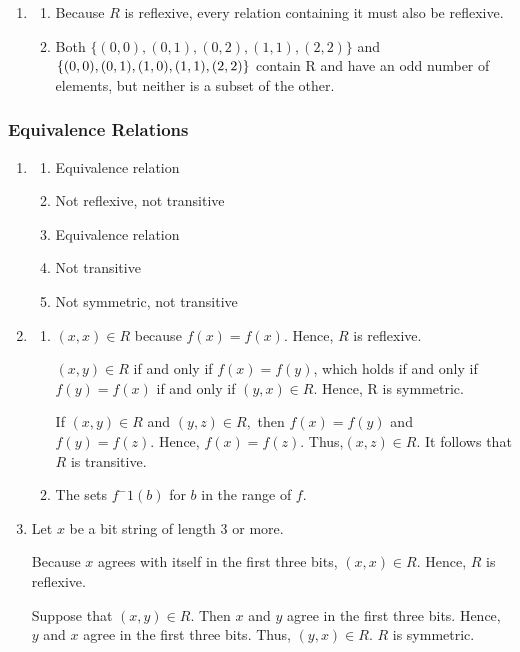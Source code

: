 \documentclass{sig-alternate-05-2015}
\begin{document}
\begin{enumerate}
\item 
	\begin{enumerate}
		\item Because $R$ is reflexive, every
		relation containing it must also be reflexive.
		\item Both $\{(0, 0),
			(0, 1), (0, 2), (1, 1), (2, 2)\}$ and $\{(0, 0),\\ (0, 1), (1, 0), (1, 1),
			(2, 2)\}$ contain R and have an odd number of elements, but
		neither is a subset of the other.
	\end{enumerate}
\end{enumerate}
\subsubsection{Equivalence Relations}
\begin{enumerate}
\item
	\begin{enumerate}
		\item Equivalence relation \item Not reflexive, not transitive
		\item Equivalence relation \item Not transitive \item Not symmetric,
		not transitive
	\end{enumerate}
\item
	\begin{enumerate}
		\item  $(x, x) \in R $ because $f (x) = f (x)$. Hence, $R$ is reflexive.
		
		$(x, y) \in R$ if and only if $f (x) = f (y)$, which holds if and
		only if $f (y) = f (x)$ if and only if $(y, x) \in R.$ Hence, R is
		symmetric. 
		
		If $(x, y) \in R$ and $(y, z) \in R,$ then $f (x) = f (y)$
		and $f (y) = f (z)$. Hence, $f (x) = f (z)$. Thus,$ (x, z) \in R$.
		It follows that $R$ is transitive. 
		\item   The sets $f^−1(b)$ for $b$ in the range of $f$.
	\end{enumerate}

\item 
Let $x$ be a bit string of length 3 or more.

Because $x$ agrees with itself in the first three bits, $(x, x)\in R.$
Hence, $R$ is reflexive. 

Suppose that $(x, y) \in R.$ Then $x$ and $y$ agree in the first three bits. 
Hence, $y$ and $x$ agree in the first three bits. Thus, $(y, x)\in R$. $R$ is symmetric.


\end{enumerate}
\end{document}
